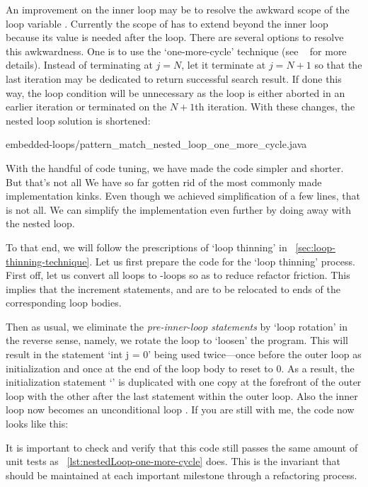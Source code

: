 An improvement on the inner loop may be to resolve the awkward scope of the loop variable
.
Currently the scope of  has to extend beyond the inner loop because
its value is needed after the loop.
There are several options to resolve this awkwardness.
One is to use the `one-more-cycle' technique (see ~\pageref{sec:one-more-cycle} for more details).
Instead of terminating at $j = N$, let it terminate at $j = N+1$ so that the last
iteration may be dedicated to return successful search result.
If done this way, the loop condition will be unnecessary as the loop is
either aborted in an earlier iteration or terminated on the $N+1$th iteration.
With these changes, the nested loop solution is shortened:

{embedded-loops/pattern_match_nested_loop_one_more_cycle.java}


With the handful of code tuning, we have made the code simpler and shorter.
But that's not all
We have so far gotten rid of the most commonly made implementation kinks.
Even though we achieved simplification of a few lines, that is not all.
We can simplify the implementation even further by doing away with the nested loop.


To that end, we will follow the prescriptions of `loop thinning' in
~\autoref{sec:loop-thinning-technique}.
Let us first prepare the code for the `loop thinning' process.
First off, let us convert all  loops to -loops so as to reduce refactor
friction.
This implies that the increment statements,  and  are to be relocated to ends
of the corresponding loop bodies.


Then as usual, we eliminate the \emph{pre-inner-loop statements} by `loop rotation' in the
reverse sense, namely, we rotate the loop to `loosen' the program.
This will result in the statement `int j = 0' being used twice---once before the outer loop as
initialization and once at the end of the loop body to reset  to 0.
As a result, the initialization statement `' is duplicated with one copy
at the forefront of the outer loop with the other after the last statement within the outer loop.
Also the inner loop now becomes an unconditional loop .
If you are still with me, the code now looks like this:

It is important to check and verify that this code still passes the same amount of
unit tests as ~\autoref{lst:nestedLoop-one-more-cycle} does.
This is the invariant that should be maintained at each important milestone
through a refactoring process.


